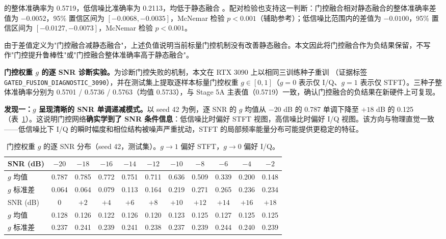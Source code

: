  的整体准确率为 0.5719，低信噪比准确率为 0.2113，均低于静态融合 。配对检验也支持这一判断：门控融合相对静态融合的整体准确率差值为 \(-0.0052\)，95\% 置信区间为 \([-0.0068,-0.0035]\)，McNemar 检验 \(p < 0.001\)（辅助参考）；低信噪比范围内的差值为 \(-0.0100\)，95\% 置信区间为 \([-0.0127,-0.0073]\)，McNemar 检验 \(p < 0.001\)。

由于差值定义为"门控融合减静态融合"，上述负值说明当前标量门控机制没有改善静态融合。本文因此将门控融合作为负结果保留，不写作"门控提升鲁棒性"或"门控融合整体准确率高于静态融合"。

\textbf{门控权重 $g$ 的逐 SNR 诊断实验。}为诊断门控失败的机制，本文在 RTX 3090 上以相同三训练种子重训 （证据标签 \texttt{GATED\_FUSION\_DIAGNOSTIC\_3090}），并在测试集上提取逐样本标量门控权重 $g \in [0,1]$（$g = 0$ 表示仅 I/Q、$g = 1$ 表示仅 STFT）。三种子整体准确率分别为 0.5701 / 0.5736 / 0.5763（均值 0.5733），与 Stage 5A 主表值（0.5719）一致，确认门控融合的负结果在新硬件上可复现。

\textbf{发现一：$g$ 呈现清晰的 SNR 单调递减模式。}以 seed 42 为例，逐 SNR 的 $g$ 均值从 $-20$ dB 的 0.787 单调下降至 $+18$ dB 的 0.125（表~\ref{tab:gate-snr-profile}）。这说明门控网络\textbf{确实学到了 SNR 条件信息}：低信噪比时偏好 STFT 视图，高信噪比时偏好 I/Q 视图。该方向与物理直觉一致——低信噪比下 I/Q 的瞬时幅度和相位结构被噪声严重扰动，STFT 的局部频率能量分布可能提供更稳定的特征。

\begin{table}[htbp]
  \centering
  \caption{门控权重 $g$ 的逐 SNR 分布（seed 42，测试集）。$g \to 1$ 偏好 STFT，$g \to 0$ 偏好 I/Q。}
  \label{tab:gate-snr-profile}
  \scriptsize
  \setlength{\tabcolsep}{3pt}
  \begin{tabular}{lcccccccccc}
    \toprule
    SNR (dB) & $-20$ & $-18$ & $-16$ & $-14$ & $-12$ & $-10$ & $-8$ & $-6$ & $-4$ & $-2$ \\
    \midrule
    $g$ 均值 & 0.787 & 0.785 & 0.772 & 0.751 & 0.711 & 0.636 & 0.509 & 0.339 & 0.200 & 0.148 \\
    $g$ 标准差 & 0.064 & 0.064 & 0.079 & 0.113 & 0.164 & 0.219 & 0.271 & 0.265 & 0.236 & 0.234 \\
    \midrule
    SNR (dB) & $0$ & $+2$ & $+4$ & $+6$ & $+8$ & $+10$ & $+12$ & $+14$ & $+16$ & $+18$ \\
    \midrule
    $g$ 均值 & 0.128 & 0.126 & 0.122 & 0.126 & 0.120 & 0.123 & 0.125 & 0.127 & 0.125 & 0.125 \\
    $g$ 标准差 & 0.237 & 0.241 & 0.239 & 0.241 & 0.238 & 0.237 & 0.239 & 0.244 & 0.240 & 0.239 \\
    \bottomrule
  \end{tabular}
\end{table}

